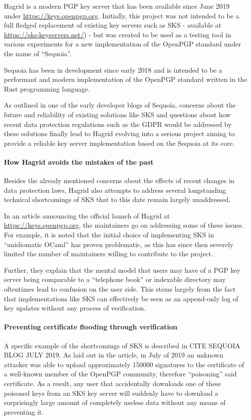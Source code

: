 

Hagrid is a modern PGP key server that has been available since June 2019 under \url{https://keys.openpgp.org}. 
Initially, this project was not intended to be a full fledged replacement of existing key servers such as SKS - available at \url{https://sks-keyservers.net/}) - but was created to be used as a testing tool in various experiments for a new implementation of the OpenPGP standard under the name of ``Sequoia''.

Sequoia has been in development since early 2018 and is intended to be a performant and modern implementation of the OpenPGP standard written in the Rust programming language.

As outlined in one of the early developer blogs of Sequoia, concerns about the future and reliability of existing solutions like SKS and questions about how recent data protection regulations such as the GDPR would be addressed by these solutions finally lead to Hagrid evolving into a serious project aiming to provide a reliable key server implementation based on the Sequoia at its core.


\paragraph{How Hagrid avoids the mistakes of the past}
\label{sec:hagrid_solves}
Besides the already mentioned concerns about the effects of recent changes in data protection laws, Hagrid also attempts to address several longstanding technical shortcomings of SKS that to this date remain largely unaddressed.

In an article announcing the official launch of Hagrid at \url{https://keys.openpgp.org}, the maintainers go on addressing some of these issues. For example, it is noted that the initial choice of implementing SKS in ``unidiomatic OCaml'' has proven problematic, as this has since then severely limited the number of maintainers willing to contribute to the project.


Further, they explain that the mental model that users may have of a PGP key server being comparable to a ``telephone book'' or indexable directory may oftentimes lead to confusion on the user side. This stems largely from the fact that implementations like SKS can effectively be seen as an append-only log of key updates without any process of verification.  

\paragraph{Preventing certificate flooding through verification}
A specific example of the shortcomings of SKS is described in CITE SEQUOIA BLOG JULY 2019. 
As laid out in the article, in July of 2019 an unknown attacker was able to upload approximately 150000 signatures to the certificate of a well-known member of the OpenPGP community, therefore ``poisoning'' said certificate. As a result, any user that accidentally downloads one of these poisoned keys from an SKS key server will suddenly have to download a surprisingly large amount of completely useless data without any means of preventing it.

